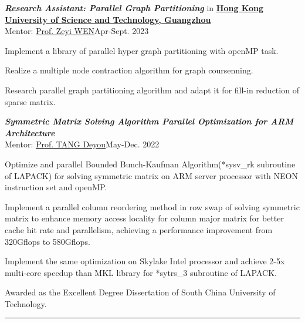 \documentclass[10pt]{article}
\newenvironment{outerlist}[1][\enskip\textbullet]%
        {%
        \begin{itemize}[label=#1, itemsep=1pt]}{\end{itemize}%
         \vspace{-0.6\baselineskip}}
\newenvironment{innerlist}[1][\enskip$\circ$]%
        {\begin{compactitem}[#1]}{\end{compactitem}}
\begin{document}
\begin{outerlist}
\item {\it\textbf{Research Assistant: Parallel Graph Partitioning}} in \textbf{\href{https://hkust-gz.edu.cn/zh/?variant=zh-cn}{Hong Kong University of Science and Technology, Guangzhou}}\\
Mentor: \href{https://zeyiwen.github.io/}{Prof. Zeyi WEN}\hfill Apr-Sept.  2023\\
\vspace{-0.2in}
\begin{innerlist}
        \item Implement a library of parallel hyper graph partitioning with openMP task.
        \item Realize a multiple node contraction algorithm for graph coursenning.
        \item Research parallel graph partitioning algorithm and adapt it for fill-in reduction of sparse matrix.
\end{innerlist}

\item {\it\textbf{Symmetric Matrix Solving Algorithm Parallel Optimization for ARM Architecture}}\\
Mentor: \href{http://www2.scut.edu.cn/sse/2018/0614/c16789a270678/page.htm}{Prof. TANG Deyou}\hfill May-Dec. 2022\\
\vspace{-0.2in}
\begin{innerlist}
        \item Optimize and parallel Bounded Bunch-Kaufman Algorithm(*sysv\_rk subroutine of LAPACK) for solving symmetric matrix on ARM server processor with NEON instruction set and openMP.
        \item Implement a parallel column reordering method in row swap of solving symmetric matrix to enhance memory access locality for column major matrix for better cache hit rate and parallelism, achieving a performance improvement from 320Gflops to 580Gflops.
        \item Implement the same optimization on Skylake Intel processor and achieve 2-5x multi-core speedup than MKL library for *sytrs\_3 subroutine of LAPACK.
        \item Awarded as the Excellent Degree Dissertation of South China University of Technology.
\end{innerlist}

\end{outerlist}

 \noindent\rule{\textwidth}{1pt}
\end{document}
